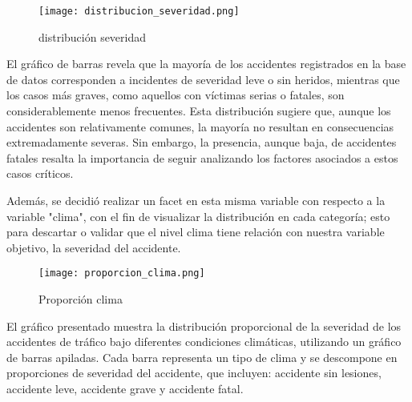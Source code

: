 \documentclass{book}
\begin{document}
\begin{figure}[htbp]
\centering
\texttt{[image: distribucion\_severidad.png]}
\caption{\label{fig:distribución severidad}distribución severidad}
\end{figure}

El gráfico de barras revela que la mayoría de los accidentes registrados en la base de datos corresponden a incidentes de severidad leve o sin heridos, mientras que los casos más graves, como aquellos con víctimas serias o fatales, son considerablemente menos frecuentes. Esta distribución sugiere que, aunque los accidentes son relativamente comunes, la mayoría no resultan en consecuencias extremadamente severas. Sin embargo, la presencia, aunque baja, de accidentes fatales resalta la importancia de seguir analizando los factores asociados a estos casos críticos.

Además, se decidió realizar un facet en esta misma variable con respecto a la variable "clima", con el fin de visualizar la distribución en cada categoría; esto para descartar o validar que el nivel clima tiene relación con nuestra variable objetivo, la severidad del accidente.

\begin{figure}[htbp]
\centering
\texttt{[image: proporcion\_clima.png]}
\caption{\label{fig:proporción clima}Proporción clima}
\end{figure}

El gráfico presentado muestra la distribución proporcional de la severidad de los accidentes de tráfico bajo diferentes condiciones climáticas, utilizando un gráfico de barras apiladas. Cada barra representa un tipo de clima y se descompone en proporciones de severidad del accidente, que incluyen: accidente sin lesiones, accidente leve, accidente grave y accidente fatal.
\end{document}
